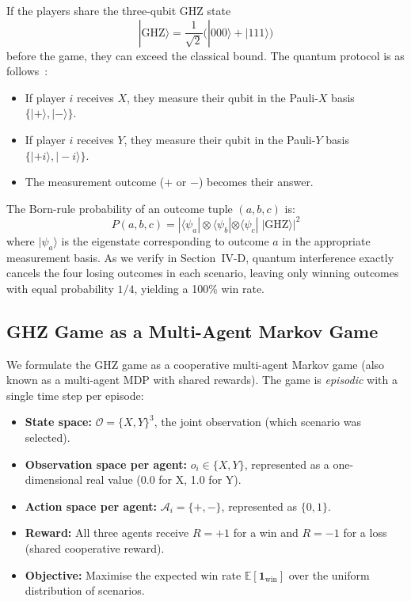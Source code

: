 \documentclass[conference]{IEEEtran}
\begin{document}
If the players share the three-qubit GHZ state
\begin{equation}
    |\text{GHZ}\rangle = \frac{1}{\sqrt{2}}\bigl(|000\rangle + |111\rangle\bigr)
\end{equation}
before the game, they can exceed the classical bound. The quantum protocol is as follows~\cite{brassard1999}:

\begin{itemize}
    \item If player $i$ receives $X$, they measure their qubit in the Pauli-$X$ basis $\{|+\rangle, |-\rangle\}$.
    \item If player $i$ receives $Y$, they measure their qubit in the Pauli-$Y$ basis $\{|+i\rangle, |-i\rangle\}$.
    \item The measurement outcome ($+$ or $-$) becomes their answer.
\end{itemize}

The Born-rule probability of an outcome tuple $(a, b, c)$ is:
\begin{equation}
    P(a,b,c) = |\langle \psi_a | \otimes \langle \psi_b | \otimes \langle \psi_c | \; |\text{GHZ}\rangle |^2
\end{equation}
where $|\psi_{a}\rangle$ is the eigenstate corresponding to outcome $a$ in the appropriate measurement basis. As we verify in Section~IV-D, quantum interference exactly cancels the four losing outcomes in each scenario, leaving only winning outcomes with equal probability $1/4$, yielding a 100\% win rate.

\subsection{GHZ Game as a Multi-Agent Markov Game}

We formulate the GHZ game as a cooperative multi-agent Markov game (also known as a multi-agent MDP with shared rewards). The game is \emph{episodic} with a single time step per episode:

\begin{itemize}
    \item \textbf{State space:} $\mathcal{O} = \{X, Y\}^3$, the joint observation (which scenario was selected).
    \item \textbf{Observation space per agent:} $o_i \in \{X, Y\}$, represented as a one-dimensional real value (0.0 for X, 1.0 for Y).
    \item \textbf{Action space per agent:} $\mathcal{A}_i = \{+, -\}$, represented as $\{0, 1\}$.
    \item \textbf{Reward:} All three agents receive $R = +1$ for a win and $R = -1$ for a loss (shared cooperative reward).
    \item \textbf{Objective:} Maximise the expected win rate $\mathbb{E}[\mathbf{1}_{\text{win}}]$ over the uniform distribution of scenarios.
\end{itemize}
\end{document}
